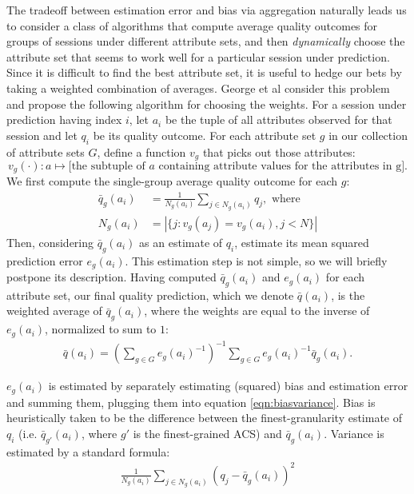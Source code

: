 \label{prediction}
The tradeoff between estimation error and bias via aggregation naturally leads us to consider a class of algorithms that compute average quality outcomes for groups of sessions under different attribute sets, and then {\it dynamically} choose the attribute set that seems to work well for a particular session under prediction.  Since it is difficult to find the best attribute set, it is useful to hedge our bets by taking a weighted combination of averages.  George et al \cite{george2008value} consider this problem and propose the following algorithm for choosing the weights.  For a session under prediction having index $i$, let $a_i$ be the tuple of all attributes observed for that session and let $q_i$ be its quality outcome.  For each attribute set $g$ in our collection of attribute sets $G$, define a function $v_g$ that picks out those attributes:
\begin{equation*}
  v_g(\cdot): a \mapsto \text{[the subtuple of $a$ containing attribute values for the attributes in g]} .
\end{equation*}
We first compute the single-group average quality outcome for each $g$:
\begin{align*}
  \bar{q}_{g}(a_i) &= \frac{1}{N_{g}(a_i)} \sum_{j \in N_{g}(a_i)} q_j, \text{ where} \\
  N_{g}(a_i) &= |\{j: v_g(a_j) = v_g(a_i), j < N\}|
\end{align*}
Then, considering $\bar{q}_{g}(a_i)$ as an estimate of $q_i$, estimate its mean squared prediction error $e_{g}(a_i)$.  This estimation step is not simple, so we will briefly postpone its description.  Having computed $\bar{q}_{g}(a_i)$ and $e_{g}(a_i)$ for each attribute set, our final quality prediction, which we denote $\bar{q}(a_i)$, is the weighted average of $\bar{q}_{g}(a_i)$, where the weights are equal to the inverse of $e_{g}(a_i)$, normalized to sum to $1$:
\begin{align*}
  \bar{q}(a_i) = (\sum_{g \in G} e_{g}(a_i)^{-1})^{-1} \sum_{g \in G} e_{g}(a_i)^{-1} \bar{q}_{g}(a_i) .
\end{align*}

$e_{g}(a_i)$ is estimated by separately estimating (squared) bias and estimation error and summing them, plugging them into equation \eqref{eqn:biasvariance}.  Bias is heuristically taken to be the difference between the finest-granularity estimate of $q_i$ (i.e. $\bar{q}_{g'}(a_i)$, where $g'$ is the finest-grained ACS) and $\bar{q}_{g}(a_i)$.  Variance is estimated by a standard formula:
\begin{align*}
  \frac{1}{N_{g}(a_i)} \sum_{j \in N_{g}(a_i)} (q_j - \bar{q}_{g}(a_i))^2
\end{align*}

